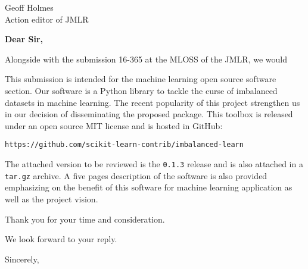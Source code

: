 \documentclass{letter}
\begin{document}

\begin{letter}{Geoff Holmes \\ Action editor of JMLR} %


  \opening{\textbf{Dear Sir,}}

  Alongside with the submission 16-365 at the MLOSS of the JMLR, we
  would

  This submission is intended for the machine learning open source software section.
  Our software is a Python library to tackle the curse of imbalanced datasets in machine learning.
  The recent popularity of this project strengthen us in our decision of disseminating the proposed package.
  This toolbox is released under an open source MIT license and is hosted in GitHub:

  \texttt{https://github.com/scikit-learn-contrib/imbalanced-learn}

  The attached version to be reviewed is the \texttt{0.1.3} release and is also attached in a \texttt{tar.gz} archive.
  A five pages description of the software is also provided emphasizing on the benefit of this software for machine learning application as well as the project vision.

  Thank you for your time and consideration.

  We look forward to your reply.

  \vspace{2\parskip} %
  \closing{Sincerely,}
  \vspace{2\parskip} %


\end{letter}
\end{document}
